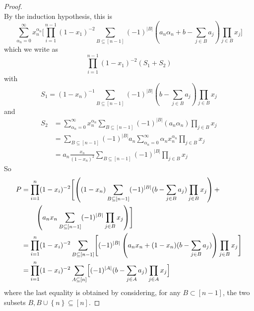 \documentclass[10pt,a4paper]{amsart}
\newcommand{\set}[1]{\left\{{#1}\right\}}
\newcommand{\tdeg}[1]{\lvert #1 \rvert}
\begin{document}
\begin{proof}
\begin{displaymath}
    \end{displaymath}  
    By the induction hypothesis, this is 
    \begin{displaymath}
      \sum_{\alpha_n=0}^\infty x_n^{\alpha_n} 
      \Biggl[
      \prod_{i=1}^{n-1}(1-x_1)^{-2} \sum_{B \subseteq 
        [n-1]} (-1)^{\tdeg{B}} (a_n \alpha_n +b - \sum_{j \in B}
      a_j) \prod_{j \in B} x_j 
      \Biggr] 
    \end{displaymath}
    which we write as 
    \begin{displaymath}
       \prod_{i=1}^{n-1}(1-x_1)^{-2} (S_1+S_2) 
     \end{displaymath}
     with 
     \begin{displaymath}
       S_1 =         (1-x_n)^{-1}
       \sum_{B \subseteq 
         [n-1]} (-1)^{\tdeg{B}} (b - \sum_{j \in B}
       a_j) \prod_{j \in B} x_j 
     \end{displaymath}
     and
     \begin{displaymath}
       \begin{split}
       S_2&= \sum_{\alpha_n=0}^\infty x_n^{\alpha_n}
        \sum_{B \subseteq [n-1]} (-1)^{\tdeg{B}} (a_n \alpha_n )
        \prod_{j \in B} x_j  \\
        &= \sum_{B \subseteq [n-1]} (-1)^{\tdeg{B}}   a_n
        \sum_{\alpha_n=0}^\infty \alpha_nx_n^{\alpha_n} \prod_{j
          \in B} x_j \\
        &= a_n \frac{x_n}{(1-x_n)^2} \sum_{B \subseteq [n-1]} (-1)^{\tdeg{B}} 
        \prod_{j \in B} x_j  
       \end{split}
     \end{displaymath}
     So
     \begin{displaymath}
       \begin{split}
        P &= \prod_{i=1}^n (1-x_i)^{-2} \Biggl[ \left(
        (1-x_n) \sum_{B \subseteq 
          [n-1]} (-1)^{\tdeg{B}} (b - \sum_{j \in B}
        a_j) \prod_{j \in B} x_j 
        \right)
        + \\
        & \qquad
        \left(
          a_n x_n \sum_{B \subseteq [n-1]} (-1)^{\tdeg{B}} 
        \prod_{j \in B} x_j
          \right)
        \Biggr] \\
        &= \prod_{i=1}^n (1-x_i)^{-2} 
        \sum_{B \subseteq 
          [n-1]} \Biggl[ (-1)^{\tdeg{B}} \left( a_nx_n + (1-x_n)(b - \sum_{j \in
            B} a_j)\right) \prod_{j \in B} x_j \Biggr] \\
        &=       \prod_{i=1}^n(1-x_i)^{-2} \sum_{A \subseteq [n]} \Bigl[
      (-1)^{\tdeg{A}}(b-\sum_{j \in A} a_j) \prod_{j \in A} x_j \Bigr]         
       \end{split}
     \end{displaymath}
    where the last equality is obtained by considering, for any \(B
    \subset [n-1]\), the two subsets \(B, B \cup \set{n} \subseteq [n]\).
  \end{proof}
\end{document}
